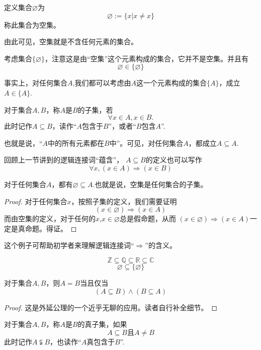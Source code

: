 \begin{definition}[空集]
定义集合$\varnothing$为
$$\varnothing:=\{x|x\neq x\}$$
称此集合为空集。
\end{definition}
由此可见，空集就是不含任何元素的集合。

\begin{example}
考虑集合$\{\varnothing\}$，注意这是由“空集”这个元素构成的集合，它并不是空集。并且有
$$\varnothing\in\{\varnothing\}$$
\end{example}

事实上，对任何集合$A$,我们都可以考虑由$A$这一个元素构成的集合$\{A\}$，成立$A\in\{A\}$.

\begin{definition}[子集]
对于集合$A,B$，称$A$是$B$的子集，若
$$\forall x\in A, x\in B.$$
此时记作$A\subseteq B$，读作“$A$包含于$B$”，或者“$B$包含$A$”.
\end{definition}
也就是说，“$A$中的所有元素都在$B$中”。可见，对任何集合$A$，都成立$A\subseteq A$.

回顾上一节讲到的逻辑连接词“蕴含”，
$A\subseteq B$的定义也可以写作
$$\forall x, (x\in A)\Rightarrow(x\in B)$$

\begin{prop}
对于任何集合$A$，都有$\varnothing\subseteq A$.也就是说，空集是任何集合的子集。
\end{prop}
\begin{proof}
对于任何集合$x$，按照子集的定义，我们需要证明
$$(x\in\varnothing)\Rightarrow(x\in A)$$
而由空集的定义，对于任何的$x$,$x\in\varnothing$总是假命题，从而
$(x\in\varnothing)\Rightarrow(x\in A)$一定是真命题。得证。
\end{proof}
这个例子可帮助初学者来理解逻辑连接词“$\Rightarrow$”的含义。

\begin{example}
$$\mathbb{Z}\subseteq\mathbb{Q}\subseteq\mathbb{R}\subseteq\mathbb{C}$$
$$\varnothing\subseteq\{\varnothing\}$$
\end{example}

\begin{prop}[集合相等的一个充要条件]
对于集合$A,B$，则$A=B$当且仅当
$$(A\subseteq B)\wedge(B\subseteq A)$$
\end{prop}
\begin{proof}
这是外延公理的一个近乎无聊的应用。读者自行补全细节。
\end{proof}

\begin{definition}[真子集]
对于集合$A,B$，称$A$是$B$的真子集，如果
$$A\subseteq B\text{且}A\neq B$$
此时记作$A\subsetneqq B$，也读作“$A$真包含于$B$”.
\end{definition}

